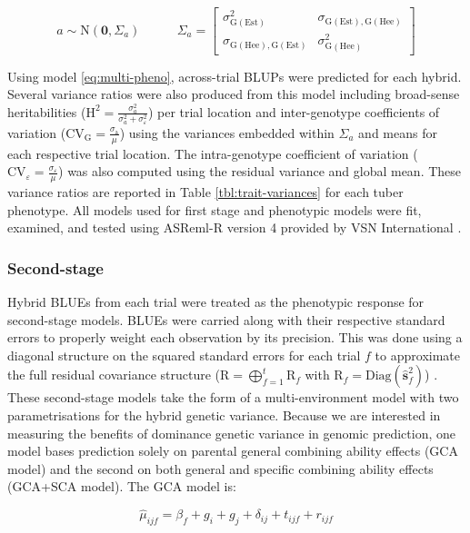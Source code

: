 \begin{refsection}
\[ a \sim \mathrm{N} \left (\mathbf{0},  \Sigma_a \right )  ~~~~~~~~~~~~~  \Sigma_a =\begin{bmatrix} \sigma^2_{\mathrm{G(Est)}} &  \sigma_{\mathrm{G(Est),G(Hee)}}\\ \sigma_{\mathrm{G(Hee),G(Est)}} & \sigma^2_{\mathrm{G(Hee)}}\end{bmatrix}  \]

Using model \eqref{eq:multi-pheno}, across-trial BLUPs were predicted for each hybrid. Several variance ratios were also produced from this model including broad-sense heritabilities (\(\mathrm H^2 = \frac{\sigma^2_{a}}{\sigma^2_{a} + \sigma^2_\varepsilon}\)) per trial location and inter-genotype coefficients of variation (\(\mathrm{CV_{G}} = \frac{\sigma_{\mathrm a}}{\mu}\)) using the variances embedded within \(\Sigma_a\) and means for each respective trial location. The intra-genotype coefficient of variation (\(\mathrm{CV}_\varepsilon = \frac{\sigma_\varepsilon}{\mu}\)) was also computed using the residual variance and global mean. These variance ratios are reported in Table \ref{tbl:trait-variances} for each tuber phenotype. All models used for first stage and phenotypic models were fit, examined, and tested using ASReml-R version 4 provided by VSN International \parencite{Butler2017}.

\subsubsection{Second-stage}

Hybrid BLUEs from each trial were treated as the phenotypic response for second-stage models. BLUEs were carried along with their respective standard errors to properly weight each observation by its precision. This was done using a diagonal structure on the squared standard errors for each trial \(f\) to approximate the full residual covariance structure (\(\mathrm{R} = \bigoplus_{f=1}^{t} \mathrm{R}_f\) with \(\mathrm{R}_f = \mathrm{Diag}(\hat{\mathbf{s}}_f^2)\)) \parencite{Frensham1997, Mohring2009}. These second-stage models take the form of a multi-environment model with two parametrisations for the hybrid genetic variance. Because we are interested in measuring the benefits of dominance genetic variance in genomic prediction, one model bases prediction solely on parental general combining ability effects (GCA model) and the second on both general and specific combining ability effects (GCA+SCA model). The GCA model is:

\begin{equation}
 \hat{\mu}_{ijf} =  \beta_f + g_i+g_j+\delta_{ij}+t_{ijf}+r_{ijf}
\label{eq:gca}
\end{equation}


\end{refsection}
